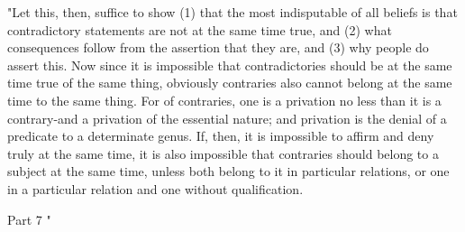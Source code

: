 "Let this, then, suffice to show (1) that the most indisputable of
all beliefs is that contradictory statements are not at the same time
true, and (2) what consequences follow from the assertion that they
are, and (3) why people do assert this. Now since it is impossible
that contradictories should be at the same time true of the same thing,
obviously contraries also cannot belong at the same time to the same
thing. For of contraries, one is a privation no less than it is a
contrary-and a privation of the essential nature; and privation is
the denial of a predicate to a determinate genus. If, then, it is
impossible to affirm and deny truly at the same time, it is also impossible
that contraries should belong to a subject at the same time, unless
both belong to it in particular relations, or one in a particular
relation and one without qualification. 

Part 7 "

